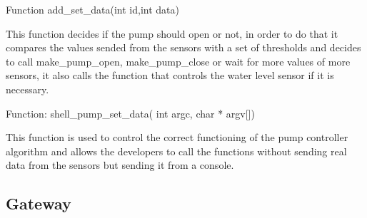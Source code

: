 \documentclass[11pt,paper=a4,parskip=half]{scrartcl}
\begin{document}
Function add\_set\_data(int id,int data)

This function decides if the pump should open or not, in order to do that it compares the values sended from the sensors with a set of thresholds and decides to call make\_pump\_open, make\_pump\_close or wait for more values of more sensors, it also calls the function that controls the water level sensor if it is necessary.

Function: shell\_pump\_set\_data( int argc, char * argv[])

This function is used to control the correct functioning of the pump controller algorithm and allows the developers to call the functions without sending real data from the sensors but sending it from a console.
\subsection{Gateway}  
\end{document}
